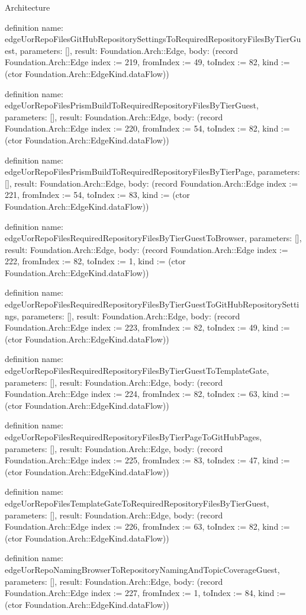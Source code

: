 \begin{lexlean}{Architecture}
\begin{semanticmodule}
definition{
  name: edgeUorRepoFilesGitHubRepositorySettingsToRequiredRepositoryFilesByTierGuest,
  parameters: [],
  result: Foundation.Arch::Edge,
  body: (record Foundation.Arch::Edge {index := 219, fromIndex := 49, toIndex := 82, kind := (ctor Foundation.Arch::EdgeKind.dataFlow)})
}

definition{
  name: edgeUorRepoFilesPrismBuildToRequiredRepositoryFilesByTierGuest,
  parameters: [],
  result: Foundation.Arch::Edge,
  body: (record Foundation.Arch::Edge {index := 220, fromIndex := 54, toIndex := 82, kind := (ctor Foundation.Arch::EdgeKind.dataFlow)})
}

definition{
  name: edgeUorRepoFilesPrismBuildToRequiredRepositoryFilesByTierPage,
  parameters: [],
  result: Foundation.Arch::Edge,
  body: (record Foundation.Arch::Edge {index := 221, fromIndex := 54, toIndex := 83, kind := (ctor Foundation.Arch::EdgeKind.dataFlow)})
}

definition{
  name: edgeUorRepoFilesRequiredRepositoryFilesByTierGuestToBrowser,
  parameters: [],
  result: Foundation.Arch::Edge,
  body: (record Foundation.Arch::Edge {index := 222, fromIndex := 82, toIndex := 1, kind := (ctor Foundation.Arch::EdgeKind.dataFlow)})
}

definition{
  name: edgeUorRepoFilesRequiredRepositoryFilesByTierGuestToGitHubRepositorySettings,
  parameters: [],
  result: Foundation.Arch::Edge,
  body: (record Foundation.Arch::Edge {index := 223, fromIndex := 82, toIndex := 49, kind := (ctor Foundation.Arch::EdgeKind.dataFlow)})
}

definition{
  name: edgeUorRepoFilesRequiredRepositoryFilesByTierGuestToTemplateGate,
  parameters: [],
  result: Foundation.Arch::Edge,
  body: (record Foundation.Arch::Edge {index := 224, fromIndex := 82, toIndex := 63, kind := (ctor Foundation.Arch::EdgeKind.dataFlow)})
}

definition{
  name: edgeUorRepoFilesRequiredRepositoryFilesByTierPageToGitHubPages,
  parameters: [],
  result: Foundation.Arch::Edge,
  body: (record Foundation.Arch::Edge {index := 225, fromIndex := 83, toIndex := 47, kind := (ctor Foundation.Arch::EdgeKind.dataFlow)})
}

definition{
  name: edgeUorRepoFilesTemplateGateToRequiredRepositoryFilesByTierGuest,
  parameters: [],
  result: Foundation.Arch::Edge,
  body: (record Foundation.Arch::Edge {index := 226, fromIndex := 63, toIndex := 82, kind := (ctor Foundation.Arch::EdgeKind.dataFlow)})
}

definition{
  name: edgeUorRepoNamingBrowserToRepositoryNamingAndTopicCoverageGuest,
  parameters: [],
  result: Foundation.Arch::Edge,
  body: (record Foundation.Arch::Edge {index := 227, fromIndex := 1, toIndex := 84, kind := (ctor Foundation.Arch::EdgeKind.dataFlow)})
}


\end{semanticmodule}
\end{lexlean}
